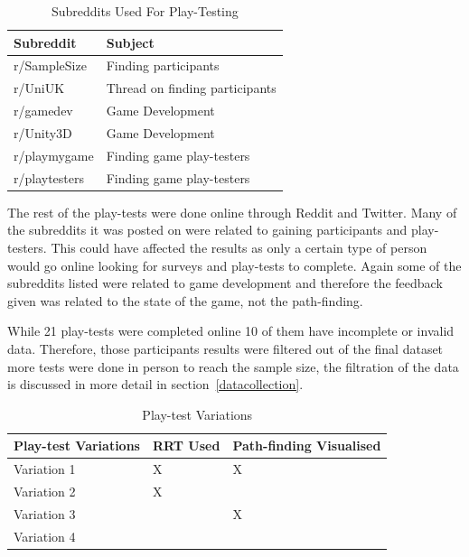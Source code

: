 \documentclass[journal]{IEEEtran}
\begin{document}
	\begin{table}[H]
		\centering
		\caption{Subreddits Used For Play-Testing}
		\label{table:Subreddits}
		\def\arraystretch{1.5}
		\begin{tabular}{ |l|l|}
			\hline
			\textbf{Subreddit}        & \textbf{Subject} \\     \hline
			r/SampleSize              & Finding participants  \\ \hline
			r/UniUK                   & Thread on finding participants \\ \hline
			r/gamedev                 & Game Development \\ \hline
			r/Unity3D                 & Game Development \\ \hline
			r/playmygame              & Finding game play-testers \\ \hline
			r/playtesters             & Finding game play-testers \\ \hline
		\end{tabular}
	\end{table}
	
	The rest of the play-tests were done online through Reddit and Twitter. Many of the subreddits it was posted on were related to gaining participants and play-testers. This could have affected the results as only a certain type of person would go online looking for surveys and play-tests to complete. Again some of the subreddits listed were related to game development and therefore the feedback given was related to the state of the game, not the path-finding.     
	
	While 21 play-tests were completed online 10 of them have incomplete or invalid data. Therefore, those participants results were filtered out of the final dataset more tests were done in person to reach the sample size, the filtration of the data is discussed in more detail in section~\ref{datacollection}.     
	
	\begin{table}[H]
		\centering
		\caption{Play-test Variations}
		\label{table:PlaytestVariations}
		\def\arraystretch{1.5}
		\begin{tabular}{ |l|l|l|}
			\hline
			\textbf{Play-test Variations} & \textbf{RRT Used}& \textbf{Path-finding Visualised} \\ \hline
			Variation 1  &  X & X \\ \hline
			Variation 2  &  X &  \\ \hline
			Variation 3  &    & X \\ \hline
			Variation 4  &    &  \\ \hline
		\end{tabular}
	\end{table}
	
\end{document}
